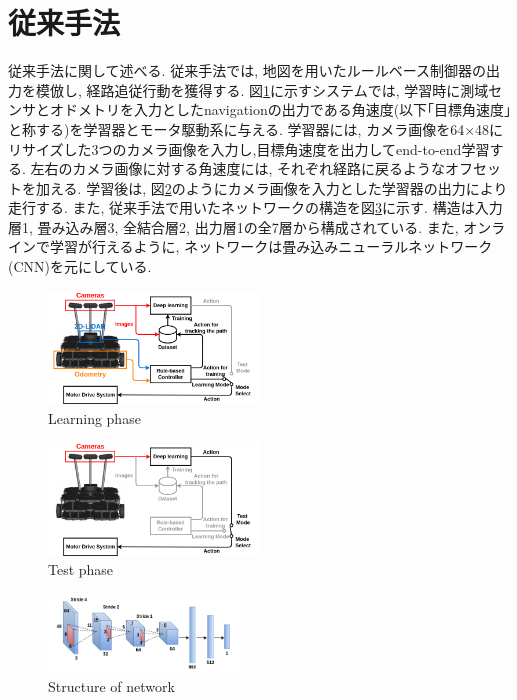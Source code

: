 \documentclass{ujarticle}
\begin{document}
\section{従来手法}%
従来手法に関して述べる. 従来手法では, 地図を用いたルールベース制御器の出力を模倣し, 経路追従行動を獲得する. 図\ref{Fig:si2020-okada}に示すシステムでは, 学習時に測域センサとオドメトリを入力としたnavigation\cite{navigation}の出力である角速度(以下｢目標角速度｣と称する)を学習器とモータ駆動系に与える. 学習器には, カメラ画像を64×48にリサイズした3つのカメラ画像を入力し,目標角速度を出力してend-to-end学習する. 左右のカメラ画像に対する角速度には, それぞれ経路に戻るようなオフセットを加える. 学習後は, 図\ref{Fig:si2020-okada-test}のようにカメラ画像を入力とした学習器の出力により走行する. また, 従来手法で用いたネットワークの構造を図\ref{Fig:cnn}に示す. 構造は入力層1, 畳み込み層3, 全結合層2, 出力層1の全7層から構成されている. また, オンラインで学習が行えるように, ネットワークは畳み込みニューラルネットワーク(CNN)を元にしている. 

\begin{figure}[h]
		\centering
		\includegraphics[width=0.5\textwidth]{img/si2020-okada.png}
		\caption{Learning phase}
		\label{Fig:si2020-okada}
\end{figure}

\begin{figure}[h]
	\centering
	\includegraphics[width=0.5\textwidth]{img/si2020-okada-test.png}
	\caption{Test phase}
	\label{Fig:si2020-okada-test}
\end{figure}

\begin{figure}[h]
	\centering
	\includegraphics[width=0.45\textwidth]{img/cnn.png}
	\caption{Structure of network}
	\label{Fig:cnn}
\end{figure}
\end{document}
